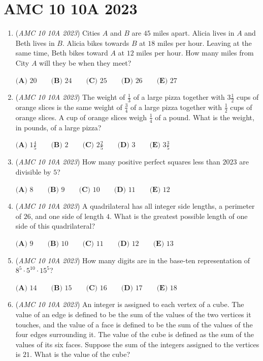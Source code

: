 \section{AMC 10 10A 2023}
        \begin{enumerate}
        	\item (\textit{AMC 10 10A 2023}) Cities $A$ and $B$ are $45$ miles apart. Alicia lives in $A$ and Beth lives in $B$. Alicia bikes towards $B$ at $18$ miles per hour. Leaving at the same time, Beth bikes toward $A$ at $12$ miles per hour. How many miles from City $A$ will they be when they meet?


 $\textbf{(A) }20\qquad\textbf{(B) }24\qquad\textbf{(C) }25\qquad\textbf{(D) }26\qquad\textbf{(E) }27$


	\item (\textit{AMC 10 10A 2023}) The weight of $\frac{1}{3}$ of a large pizza together with $3 \frac{1}{2}$ cups of orange slices is the same weight of $\frac{3}{4}$ of a large pizza together with $\frac{1}{2}$ cups of orange slices. A cup of orange slices weigh $\frac{1}{4}$ of a pound. What is the weight, in pounds, of a large pizza?


 $\textbf{(A) }1\frac{4}{5}\qquad\textbf{(B) }2\qquad\textbf{(C) }2\frac{2}{5}\qquad\textbf{(D) }3\qquad\textbf{(E) }3\frac{3}{5}$


	\item (\textit{AMC 10 10A 2023}) How many positive perfect squares less than $2023$ are divisible by $5$? 


 $\textbf{(A) }8\qquad\textbf{(B) }9\qquad\textbf{(C) }10\qquad\textbf{(D) }11\qquad\textbf{(E) }12$


	\item (\textit{AMC 10 10A 2023}) A quadrilateral has all integer side lengths, a perimeter of $26$, and one side of length $4$. What is the greatest possible length of one side of this quadrilateral?


 $\textbf{(A) }9\qquad\textbf{(B) }10\qquad\textbf{(C) }11\qquad\textbf{(D) }12\qquad\textbf{(E) }13$


	\item (\textit{AMC 10 10A 2023}) How many digits are in the base-ten representation of $8^5 \cdot 5^{10} \cdot 15^5$?


 $\textbf{(A) } 14 \qquad\textbf{(B) }15 \qquad\textbf{(C) }16 \qquad\textbf{(D) }17 \qquad\textbf{(E) } 18$


	\item (\textit{AMC 10 10A 2023}) An integer is assigned to each vertex of a cube. The value of an edge is defined to be the sum of the values of the two vertices it touches, and the value of a face is defined to be the sum of the values of the four edges surrounding it. The value of the cube is defined as the sum of the values of its six faces. Suppose the sum of the integers assigned to the vertices is $21$. What is the value of the cube? 



\end{enumerate}
